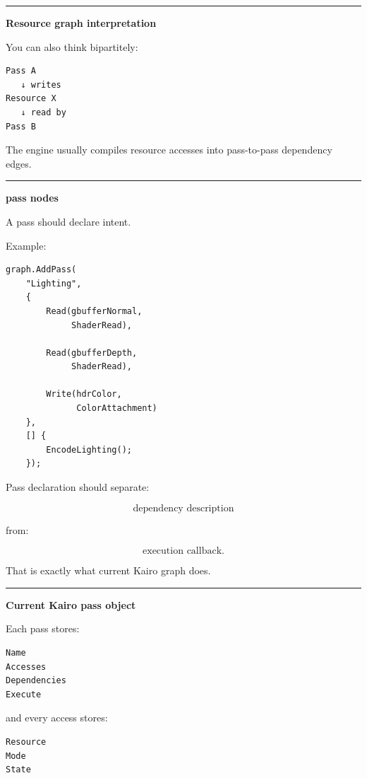 \begin{center}\rule{0.5\linewidth}{0.5pt}\end{center}

\textbf{Resource graph interpretation}

You can also think bipartitely:

\begin{verbatim}
Pass A
   ↓ writes
Resource X
   ↓ read by
Pass B
\end{verbatim}

The engine usually compiles resource accesses into pass-to-pass dependency edges.

\begin{center}\rule{0.5\linewidth}{0.5pt}\end{center}

\textbf{pass nodes}

A pass should declare intent.

Example:

\begin{verbatim}
graph.AddPass(
    "Lighting",
    {
        Read(gbufferNormal,
             ShaderRead),

        Read(gbufferDepth,
             ShaderRead),

        Write(hdrColor,
              ColorAttachment)
    },
    [] {
        EncodeLighting();
    });
\end{verbatim}

Pass declaration should separate:

\[
\boxed{
\text{dependency description}
}
\]

from:

\[
\boxed{
\text{execution callback}.
}
\]

That is exactly what current Kairo graph does.

\begin{center}\rule{0.5\linewidth}{0.5pt}\end{center}

\textbf{Current Kairo pass object}

Each pass stores:

\begin{verbatim}
Name
Accesses
Dependencies
Execute
\end{verbatim}

and every access stores:

\begin{verbatim}
Resource
Mode
State
\end{verbatim}

